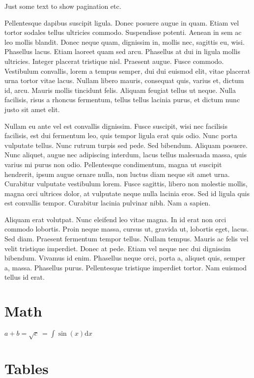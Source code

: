 Just some text to show pagination etc. 

Pellentesque dapibus suscipit ligula.  Donec posuere augue in quam.  Etiam vel tortor sodales tellus ultricies commodo.  Suspendisse potenti.  Aenean in sem ac leo mollis blandit.  Donec neque quam, dignissim in, mollis nec, sagittis eu, wisi.  Phasellus lacus.  Etiam laoreet quam sed arcu.  Phasellus at dui in ligula mollis ultricies.  Integer placerat tristique nisl.  Praesent augue.  Fusce commodo.  Vestibulum convallis, lorem a tempus semper, dui dui euismod elit, vitae placerat urna tortor vitae lacus.  Nullam libero mauris, consequat quis, varius et, dictum id, arcu.  Mauris mollis tincidunt felis.  Aliquam feugiat tellus ut neque.  Nulla facilisis, risus a rhoncus fermentum, tellus tellus lacinia purus, et dictum nunc justo sit amet elit.

Nullam eu ante vel est convallis dignissim.  Fusce suscipit, wisi nec facilisis facilisis, est dui fermentum leo, quis tempor ligula erat quis odio.  Nunc porta vulputate tellus.  Nunc rutrum turpis sed pede.  Sed bibendum.  Aliquam posuere.  Nunc aliquet, augue nec adipiscing interdum, lacus tellus malesuada massa, quis varius mi purus non odio.  Pellentesque condimentum, magna ut suscipit hendrerit, ipsum augue ornare nulla, non luctus diam neque sit amet urna.  Curabitur vulputate vestibulum lorem.  Fusce sagittis, libero non molestie mollis, magna orci ultrices dolor, at vulputate neque nulla lacinia eros.  Sed id ligula quis est convallis tempor.  Curabitur lacinia pulvinar nibh.  Nam a sapien.

Aliquam erat volutpat.  Nunc eleifend leo vitae magna.  In id erat non orci commodo lobortis.  Proin neque massa, cursus ut, gravida ut, lobortis eget, lacus.  Sed diam.  Praesent fermentum tempor tellus.  Nullam tempus.  Mauris ac felis vel velit tristique imperdiet.  Donec at pede.  Etiam vel neque nec dui dignissim bibendum.  Vivamus id enim.  Phasellus neque orci, porta a, aliquet quis, semper a, massa.  Phasellus purus.  Pellentesque tristique imperdiet tortor.  Nam euismod tellus id erat.

\section{Math}
\label{sec:math}

\(a+b=\sqrt{c}\ = \int \sin(x) \mathrm{d}x \) 


\section{Tables}
\label{sec:tables}

